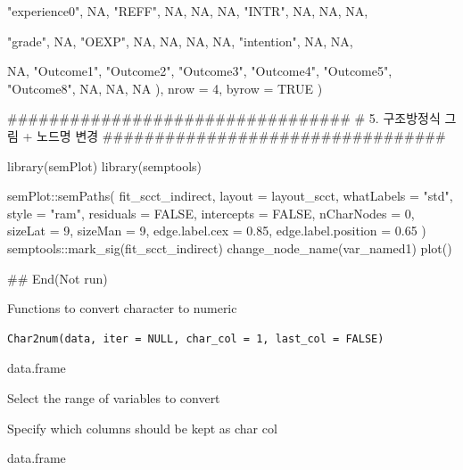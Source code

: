 \documentclass[a4paper]{book}
\begin{document}
\begin{Examples}
\begin{ExampleCode}
    "experience0", NA, "REFF", NA, NA,
        NA, "INTR", NA, NA, NA,

    "grade", NA, "OEXP", NA, NA,
        NA, NA, "intention", NA, NA,

    NA, "Outcome1", "Outcome2", "Outcome3", "Outcome4",
        "Outcome5", "Outcome8", NA, NA, NA
  ),
  nrow = 4,
  byrow = TRUE
)

#################################
# 5. 구조방정식 그림 + 노드명 변경
#################################

library(semPlot)
library(semptools)

semPlot::semPaths(
  fit_scct_indirect,
  layout        = layout_scct,
  whatLabels    = "std",
  style         = "ram",
  residuals     = FALSE,
  intercepts    = FALSE,
  nCharNodes    = 0,
  sizeLat       = 9,
  sizeMan       = 9,
  edge.label.cex = 0.85,
  edge.label.position = 0.65
) %
  semptools::mark_sig(fit_scct_indirect) %
  change_node_name(var_named1) %
  plot()


## End(Not run)
\end{ExampleCode}
\end{Examples}
%
\begin{Description}
Functions to convert character to numeric
\end{Description}
%
\begin{Usage}
\begin{verbatim}
Char2num(data, iter = NULL, char_col = 1, last_col = FALSE)
\end{verbatim}
\end{Usage}
%
\begin{Arguments}
\begin{ldescription}
\item[\code{data}] data.frame

\item[\code{iter}] Select the range of variables to convert

\item[\code{char\_col}] Specify which columns should be kept as char col
\end{ldescription}
\end{Arguments}
%
\begin{Value}
data.frame
\end{Value}
%
\end{document}
